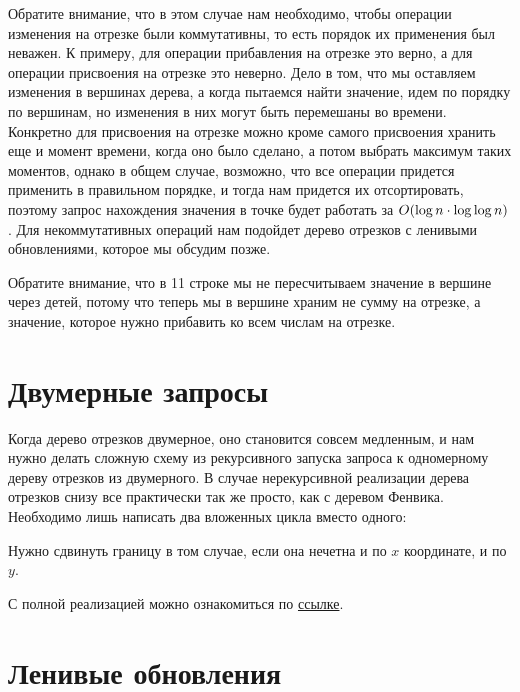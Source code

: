 \begin{observation}
    Обратите внимание, что в этом случае нам необходимо, чтобы операции изменения на отрезке были коммутативны, то есть порядок их применения был неважен. К примеру, для операции прибавления на отрезке это верно, а для операции присвоения на отрезке это неверно. Дело в том, что мы оставляем изменения в вершинах дерева, а когда пытаемся найти значение, идем по порядку по вершинам, но изменения в них могут быть перемешаны во времени. Конкретно для присвоения на отрезке можно кроме самого присвоения хранить еще и момент времени, когда оно было сделано, а потом выбрать максимум таких моментов, однако в общем случае, возможно, что все операции придется применить в правильном порядке, и тогда нам придется их отсортировать, поэтому запрос нахождения значения в точке будет работать за $O(\log n \cdot \log \log n)$. Для некоммутативных операций нам подойдет дерево отрезков с ленивыми обновлениями, которое мы обсудим позже.
\end{observation}



Обратите внимание, что в 11 строке мы не пересчитываем значение в вершине через детей, потому что теперь мы в вершине храним не сумму на отрезке, а значение, которое нужно прибавить ко всем числам на отрезке.

\section{Двумерные запросы}

Когда дерево отрезков двумерное, оно становится совсем медленным, и нам нужно делать сложную схему из рекурсивного запуска запроса к одномерному дереву отрезков из двумерного. В случае нерекурсивной реализации дерева отрезков снизу все практически так же просто, как с деревом Фенвика. Необходимо лишь написать два вложенных цикла вместо одного:



Нужно сдвинуть границу в том случае, если она нечетна и по $x$ координате, и по $y$.

С полной реализацией можно ознакомиться по \href{https://pastebin.com/yBiQB5yu}{ссылке}.

\section{Ленивые обновления}

